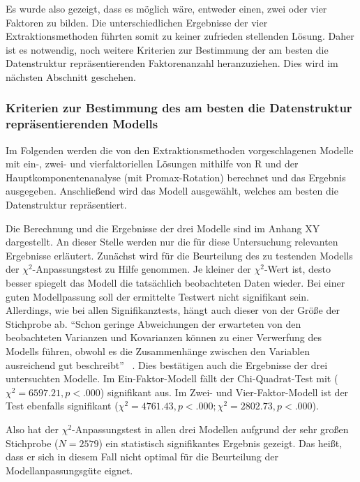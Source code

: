 \documentclass[12pt,a4paper]{article}
\begin{document}
	Es wurde also gezeigt, dass es möglich wäre, entweder einen, zwei oder vier Faktoren zu bilden. Die unterschiedlichen Ergebnisse der vier Extraktionsmethoden führten somit zu keiner zufrieden stellenden Lösung. Daher  ist es notwendig, noch weitere Kriterien zur Bestimmung der am besten die Datenstruktur repräsentierenden Faktorenanzahl heranzuziehen. Dies wird im nächsten Abschnitt geschehen.

\subsubsection{Kriterien zur Bestimmung des am besten die Datenstruktur repräsentierenden Modells}
 
Im Folgenden werden die von den Extraktionsmethoden vorgeschlagenen Modelle mit ein-, zwei- und vierfaktoriellen Lösungen mithilfe von R und der Hauptkomponentenanalyse (mit Promax-Rotation) berechnet und das Ergebnis ausgegeben. Anschließend wird das Modell ausgewählt, welches am besten die Datenstruktur repräsentiert.

	Die Berechnung und die Ergebnisse der drei Modelle sind im Anhang XY dargestellt. An dieser Stelle werden nur die für diese Untersuchung relevanten Ergebnisse erläutert. Zunächst wird für die Beurteilung des zu testenden Modells der $\chi^2$-Anpassungstest zu Hilfe genommen. Je kleiner der $\chi^2$-Wert ist, desto besser spiegelt das Modell die tatsächlich beobachteten Daten wieder. Bei einer guten Modellpassung soll der ermittelte Testwert nicht signifikant sein. Allerdings, wie bei allen Signifikanztests, hängt auch dieser von der Größe der Stichprobe ab. "`Schon geringe Abweichungen der erwarteten von den beobachteten Varianzen und Kovarianzen können zu einer Verwerfung des Modells führen, obwohl es die Zusammenhänge zwischen den Variablen ausreichend gut beschreibt"' ~\parencite[S.~898]{Eid_2013}. Dies bestätigen auch die Ergebnisse der drei untersuchten Modelle. Im Ein-Faktor-Modell fällt der Chi-Quadrat-Test mit ($\chi^2 = 6597.21, p< .000$) signifikant aus. Im Zwei- und Vier-Faktor-Modell ist der Test ebenfalls signifikant ($\chi^2  = 4761.43, p< .000;  \chi^2 = 2802.73, p < .000$).
	
	Also hat der $\chi^2$-Anpassungstest in allen drei Modellen aufgrund der sehr großen Stichprobe ($N = 2579$) ein statistisch signifikantes Ergebnis gezeigt. Das heißt, dass er sich in diesem Fall nicht optimal für die Beurteilung der Modellanpassungsgüte eignet.
	
\end{document}
